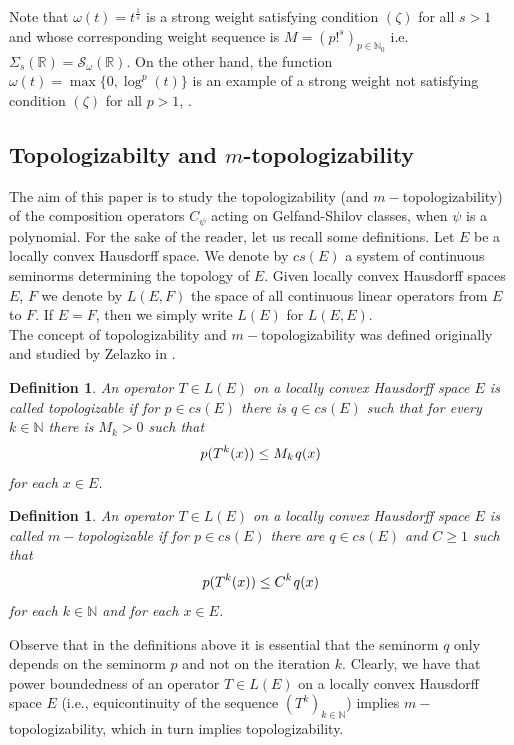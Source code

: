 \documentclass[12pt,reqno]{amsart} %
\newtheorem{definition}[theorem]{Definition}
\numberwithin{equation}{section}
\begin{document}
Note that $\omega(t) = t^{\frac{1}{s}}$ is a strong weight satisfying condition $(\zeta)$ for all $s>1$ and whose corresponding weight sequence is $M=(p!^s)_{p\in\mathbb{N}_0}$ i.e. $\Sigma_s({\mathbb R}) = {\mathcal S}_\omega({\mathbb R}).$ On the other hand, the function $\omega(t)=\max\{0,\log^p(t)\}$ is an example of a strong weight not satisfying condition $(\zeta)$ for all $p>1$, \cite[20 Example]{BMM}.



\subsection{Topologizabilty and $m$-topologizability}
The aim of this paper is to study the topologizability (and $m-$topologi\-zability) of the composition operators $C_\psi$ acting on Gelfand-Shilov classes, when $\psi$ is a polynomial.
For the sake of the reader, let us recall some definitions. Let $E$ be a locally convex Hausdorff space.  We denote by $cs(E)$ a system of continuous seminorms determining the topology of $E$. Given locally convex Hausdorff spaces $E$, $F$ we denote by $L(E,F)$ the space of all continuous linear operators from $E$ to $F$. If $E=F$, then we simply write $L(E)$ for $L(E, E)$.\\

The concept of topologizability and $m-$topologizability was defined originally and studied by Zelazko in  \cite{z}.
\begin{definition}
	An operator $T \in L(E)$ on a locally convex Hausdorff space $E$ is called
	topologizable if for  $p\in cs(E)$ there is  $q \in cs(E)$ such that for every $k\in\mathbb{N}$ there is $M_k>0$ such that
	\begin{equation*}
		p(T^k(x)) \leq M_k \hspace{0.03cm} q(x)
	\end{equation*} for each $x \in E$.
\end{definition}

\begin{definition}
	An operator $T \in L(E)$ on a locally convex Hausdorff  space $E$ is called $m-$topologizable if for  $p\in cs(E)$ there are  $q \in cs(E)$ and $C\geq 1$ such that 
	\begin{equation*}
		p(T^k(x)) \leq C^k \hspace{0.03cm} q(x)
	\end{equation*}
	for each $k\in\mathbb{N}$ and for each $x\in E$.
\end{definition}
Observe that in the definitions above it is essential that the seminorm $q$ only depends on the seminorm $p$ and not on the iteration $k$. Clearly, we have that power boundedness of an operator $T\in L(E)$ on a locally convex  Hausdorff space $E$ (i.e., equicontinuity of the sequence $(T^k)_{k\in{\mathbb N}}$) implies $m-$topologizability, which in turn implies topologizability.\\
\end{document}
